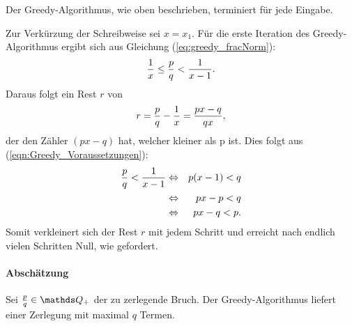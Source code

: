 \begin{satz}
	Der Greedy-Algorithmus, wie oben beschrieben, terminiert für jede Eingabe.
\end{satz}
\begin{bew}
	Zur Verkürzung der Schreibweise sei  $x = x_1$.
	Für die erste Iteration des Greedy-Algorithmus ergibt sich aus Gleichung (\ref{eq:greedy_fracNorm}):
	\begin{equation}\label{eqn:Greedy_Voraussetzungen}
		\frac{1}{x} \leq \frac{p}{q} < \frac{1}{x-1}.
	\end{equation}
	Daraus folgt ein Rest $r$ von
	$$ r = \frac{p}{q}-\frac{1}{x} = \frac{px-q}{qx},$$
	der den Zähler $(px-q)$ hat, welcher kleiner als p ist. Dies folgt aus (\ref{eqn:Greedy_Voraussetzungen}):
	\begin{eqnarray*}
		\frac{p}{q} < \frac{1}{x-1}& \Leftrightarrow & p(x-1)<q\\
		& \Leftrightarrow & px-p < q\\
		& \Leftrightarrow & px-q < p.\\
	\end{eqnarray*}
	Somit verkleinert sich der Rest $r$ mit jedem Schritt und erreicht nach endlich vielen Schritten Null, wie gefordert.
\end{bew}

\paragraph{Abschätzung} Sei $\frac{p}{q} \in \Q_+$ der zu zerlegende Bruch. Der Greedy-Algorithmus liefert einer Zerlegung mit maximal $q$ Termen. \cite[S.2]{Gong1992}